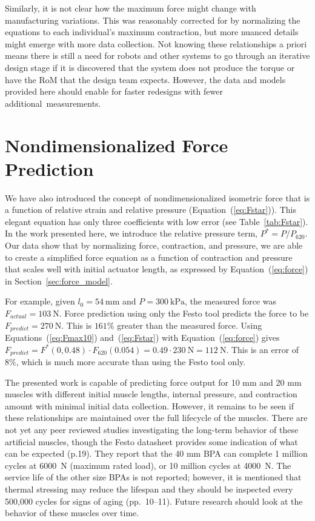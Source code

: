 Similarly, it is not clear how the maximum force might change with manufacturing variations. This was reasonably corrected for by normalizing the equations to each individual's maximum contraction, but more nuanced details might emerge with more data collection. Not knowing these relationships a priori means there is still a need for robots and other systems to go through an iterative design stage if it is discovered that the system does not produce the torque or have the RoM that the design team expects. However, the data and models provided here should enable for faster redesigns with fewer \mbox{additional measurements.}


\section{Nondimensionalized Force Prediction}

We have also introduced the concept of nondimensionalized isometric force that is a function of relative strain and relative pressure (Equation~(\ref{eq:Fstar})). This elegant equation has only three coefficients with low error (see Table~\ref{tab:Fstar}). In the work presented here, we introduce the relative pressure term, $P^*=P/P_{620}$. Our data show that by normalizing force, contraction, and pressure, we are able to create a simplified force equation as a function of contraction and pressure that scales well with initial actuator length, as expressed by Equation~(\ref{eq:force}) in Section~\ref{sec:force_model}.

For example, given $l_0=\qty{54}{\mm}$ and $P=\qty{300}{\kPa}$, the measured force was \mbox{$F_{actual} = \qty{103}{\N}$.} Force prediction using only the Festo tool predicts the force to be \mbox{$F_{predict} = \qty{270}{\N}$.} This is $161\%$ greater than the measured force. Using Equations~(\ref{eq:Fmax10}) and~(\ref{eq:Fstar}) with Equation~(\ref{eq:force}) gives $F_{predict} = F^*(0, 0.48) \cdot F_{620}(0.054) = 0.49 \cdot \qty{230}{\N} = \qty{112}{\N}$. This is an error of $8\%$, which is much more accurate than using the Festo tool only.

The presented work is capable of predicting force output for 10 mm and 20 mm muscles with different initial muscle lengths, internal pressure, and contraction amount with minimal initial data collection. However, it remains to be seen if these relationships are maintained over the full lifecycle of the muscles. There are not yet any peer reviewed studies investigating the long-term behavior of these artificial muscles, though the Festo datasheet provides some indication of what can be expected \citep{festo_2026} (p.19). They report that the 40 mm BPA can complete 1 million cycles at \qty{6000}{\N} (maximum rated load), or 10 million cycles at \qty{4000}{\N}. The service life of the other size BPAs is not reported; however, it is mentioned that thermal stressing may reduce the lifespan and they should be inspected every 500,000 cycles for signs of aging \citep{festo_2018} (pp.~10--11). Future research should look at the behavior of these muscles over time.

